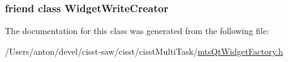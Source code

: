 \subsubsection[{Widget\+Write\+Creator}]{\setlength{\rightskip}{0pt plus 5cm}friend class {\bf Widget\+Write\+Creator}\hspace{0.3cm}{\ttfamily [friend]}}\label{classmts_qt_widget_factory_a19ec73574902b95864ee67c18b960512}


The documentation for this class was generated from the following file\+:\begin{DoxyCompactItemize}
\item 
/\+Users/anton/devel/cisst-\/saw/cisst/cisst\+Multi\+Task/\hyperlink{mts_qt_widget_factory_8h}{mts\+Qt\+Widget\+Factory.\+h}\end{DoxyCompactItemize}
